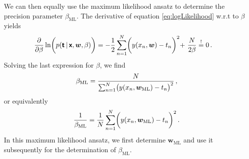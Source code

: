 \documentclass[11pt,DINA4, fleqn]{amsart}
\begin{document}
We can then equally use the maximum likelihood ansatz to determine the precision parameter $\beta_{\text{ML}}$. The derivative of equation \eqref{eq:logLikelihood} w.r.t to $\beta$ yields
\begin{align}
\dfrac{\partial}{\partial \beta} \ln\biggl(p(\boldsymbol{\mathsf{t}} \, | \, \boldsymbol{\mathsf{x}}, \bm{w}, \beta)\biggl) &= -\dfrac{1}{2}\sum\displaylimits_{n=1}^{N} \biggl(y(x_n, \bm{w}) - t_n\biggl)^2
+\,\, \dfrac{N}{2\beta} \stackrel{!}{=} 0 \, .
\end{align}
Solving the last expression for $\beta$, we find
\begin{align}
\beta_{\text{ML}} = \dfrac{N}{\sum\displaylimits_{n=1}^{N} \bigl(y(x_n, \bm{w}_{\text{ML}}) - t_n\bigl)^2} \, ,
\end{align}
or equivalently
\begin{align}
\dfrac{1}{\beta_{\text{ML}}} = \dfrac{1}{N} \sum\displaylimits_{n=1}^{N} \biggl(y(x_n, \bm{w}_{\text{ML}}) - t_n\biggl)^2 \, .
\end{align}
In this maximum likelihood ansatz, we first determine $\bm{w}_{\text{ML}}$ and use it subsequently for the determination of $\beta_{\text{ML}}$.
\end{document}
